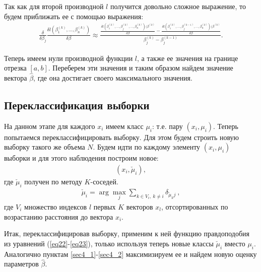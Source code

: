 \documentclass[a4paper,14pt]{extarticle}
\begin{document}
Так как для второй производной $l$ получится довольно сложное выражение, то будем приближать ее с помощью выражения:
\begin{eqnarray}
    \frac{\delta }{\delta \beta_j}\frac{\delta l(\beta_1^{(k)},\dots, \beta_n^{(k)}) }{\delta \beta}\approx \frac{\frac{\delta l(\beta_1^{(k)},\dots,\beta_j^{(k)},\dots, \beta_n^{(k)}) (\beta^{(k)}}{\delta \beta}-\frac{\delta l(\beta_1^{(k)},\dots,\beta_j^{(k-1)},\dots, \beta_n^{(k)}) (\beta^{(k)}}{\delta \beta}}{\beta_j^{(k)}-\beta_j^{(k-1)}}.
\end{eqnarray}

Теперь имеем нули производной функции $l$, а также ее значения на границе отрезка $[a,b]$.
Переберем эти значения и таким образом найдем значение вектора $\hat{\beta}$, где она достигает своего максимального значения.




\subsection{Переклассификация выборки}\label{sec4_3}
На данном этапе для каждого $x_i$ имеем класс $\mu_i$: т.е. пару $(x_i,\mu_i)$.
Теперь попытаемся переклассифицировать выборку. 
Для этом будем строить новую выборку такого же объема $N$.
Будем идти по каждому элементу $(x_i, \mu_i)$ выборки и для этого наблюдения построим новое:
\begin{eqnarray}
    (x_i, \check{\mu}_i),
\end{eqnarray}
где $\check{\mu}_i$ получен по методу $K$-соседей.\hfill\break
\begin{eqnarray}
    \check{\mu}_i = \arg\max_j \sum_{k \in V_i,~k\neq i} \delta_{\check{\mu}_k j}~,
\end{eqnarray}
где $V_i$ множество индексов $l$ первых $K$ векторов $x_l$, отсортированных по возрастанию расстояния до вектора $x_i$.

Итак, переклассифицировав выборку, применим к ней функцию правдоподобия из уравнений (\ref{eq22}-\ref{eq23}), только используя теперь новые классы $\check{\mu}_i$ вместо $\mu_i$. 
Аналогично пунктам \ref{sec4_1}-\ref{sec4_2} максимизируем ее и найдем новую оценку параметров $\hat{\beta}$.

\newpage
\end{document}
